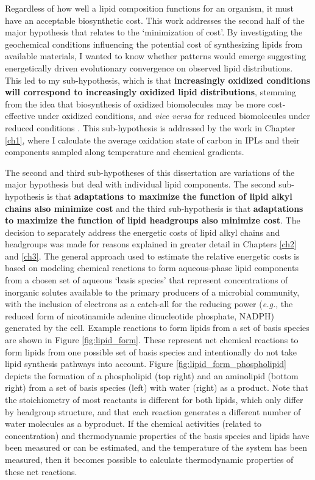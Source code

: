 Regardless of how well a lipid composition functions for an organism, it must have an acceptable biosynthetic cost. This work addresses the second half of the major hypothesis that relates to the `minimization of cost'. By investigating the geochemical conditions influencing the potential cost of synthesizing lipids from available materials, I wanted to know whether patterns would emerge suggesting energetically driven evolutionary convergence on observed lipid distributions. This led to my sub-hypothesis, which is that \textbf{increasingly oxidized conditions will correspond to increasingly oxidized lipid distributions}, stemming from the idea that biosynthesis of oxidized biomolecules may be more cost-effective under oxidized conditions, and \textit{vice versa} for reduced biomolecules under reduced conditions \citep{amend1998energetics, shock2010potential, dick2011calculation, dick2013metastable}. This sub-hypothesis is addressed by the work in Chapter \ref{ch1}, where I calculate the average oxidation state of carbon in IPLs and their components sampled along temperature and chemical gradients.

The second and third sub-hypotheses of this dissertation are variations of the major hypothesis but deal with individual lipid components. The second sub-hypothesis is that \textbf{adaptations to maximize the function of lipid alkyl chains also minimize cost} and the third sub-hypothesis is that \textbf{adaptations to maximize the function of lipid headgroups also minimize cost}. The decision to separately address the energetic costs of lipid alkyl chains and headgroups was made for reasons explained in greater detail in Chapters \ref{ch2} and \ref{ch3}. The general approach used to estimate the relative energetic costs is based on modeling chemical reactions to form aqueous-phase lipid components from a chosen set of aqueous `basis species' that represent concentrations of inorganic solutes available to the primary producers of a microbial community, with the inclusion of electrons as a catch-all for the reducing power (\textit{e.g.}, the reduced form of nicotinamide adenine dinucleotide phosphate, NADPH) generated by the cell. Example reactions to form lipids from a set of basis species are shown in Figure \ref{fig:lipid_form}. These represent net chemical reactions to form lipids from one possible set of basis species and intentionally do not take lipid synthesis pathways into account. Figure \ref{fig:lipid_form_phospholipid} depicts the formation of a phospholipid (top right) and an aminolipid (bottom right) from a set of basis species (left) with water (right) as a product. Note that the stoichiometry of most reactants is different for both lipids, which only differ by headgroup structure, and that each reaction generates a different number of water molecules as a byproduct. If the chemical activities (related to concentration) and thermodynamic properties of the basis species and lipids have been measured or can be estimated, and the temperature of the system has been measured, then it becomes possible to calculate thermodynamic properties of these net reactions.

